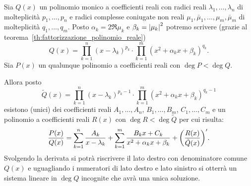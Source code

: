 \begin{theorem}
\label{th:Hermite}%
%
%
Sia $Q(x)$ un polinomio monico a coefficienti reali
con radici reali $\lambda_1, \dots, \lambda_n$ di molteplicità
$p_1, \dots, p_n$ e radici complesse coniugate non reali
$\mu_1, \bar \mu_1, \dots, \mu_m, \bar \mu_m$ di molteplicità
$q_1, \dots, q_m$. Posto $\alpha_k = 2\Re \mu_k$ e $\beta_k = {\left|\mu_k\right|}^2$
potremo scrivere (grazie al teorema~\ref{th:fattorizzazione_polinomio_reale})
\begin{equation}\label{eq:8845638}
  Q(x) = \prod_{k=1}^n (x-\lambda_k)^{p_k} \cdot \prod_{k=1}^m (x^2+ \alpha_k x + \beta_k)^{q_k}.
\end{equation}
Sia $P(x)$ un qualunque polinomio a coefficienti reali
con $\deg P < \deg Q$.

Allora posto
\[
 \tilde Q(x) = \prod_{k=1}^n (x-\lambda_k)^{p_k-1} \cdot \prod_{k=1}^m (x^2+\alpha_k x+\beta_k)^{q_k-1}
\]
esistono (unici) dei coefficienti reali
$A_1,\dots, A_n$, $B_1, \dots, B_m$, $C_1,\dots, C_m$
e un polinomio a coefficienti reali $R(x)$ con $\deg R < \deg \tilde Q$
per cui risulta:
\begin{equation}\label{eq:scomposizione_hermite}
  \frac{P(x)}{Q(x)} = \sum_{k=1}^n \frac{A_k}{x-\lambda_k}
  + \sum_{k=1}^m \frac{B_k x + C_k}{x^2+\alpha_k x + \beta_k}
  + {\left( \frac{R(x)}{\tilde Q(x)} \right)}'.
\end{equation}
Svolgendo la derivata si potrà
riscrivere il lato destro con denominatore comune $Q(x)$
e uguagliando i numeratori di lato destro e lato sinistro
si otterrà un sistema lineare in $\deg Q$ incognite
che avrà una unica soluzione.
\end{theorem}
%
